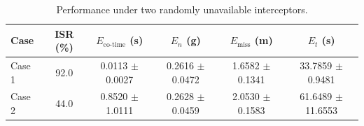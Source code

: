 \begin{table}[!t]
\centering
\small
\setlength{\tabcolsep}{2.8pt}
\renewcommand{\arraystretch}{1.08}
\caption{Performance under two randomly unavailable interceptors.}
\label{tab:two_interceptor_failure}
\begin{tabular}{@{}lccccc@{}}
\toprule
Case & ISR (\%) & $E_{\mathrm{co\text{-}time}}$ (s) & $E_n$ (g) & $E_{\mathrm{miss}}$ (m) & $E_t$ (s) \\
\midrule
Case 1 & 92.0 & 0.0113 $\pm$ 0.0027 & 0.2616 $\pm$ 0.0472 & 1.6582 $\pm$ 0.1341 & 33.7859 $\pm$ 0.9481 \\
Case 2 & 44.0 & 0.8520 $\pm$ 1.0111 & 0.2628 $\pm$ 0.0459 & 2.0530 $\pm$ 0.1583 & 61.6489 $\pm$ 11.6553 \\
\bottomrule
\end{tabular}
\end{table}
